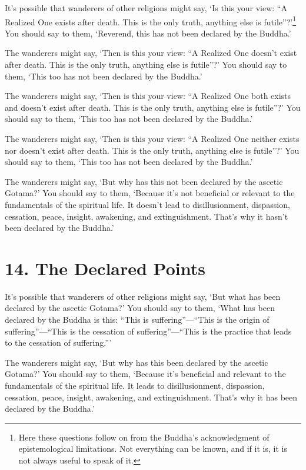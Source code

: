 \documentclass[12pt,openany]{book}%
\begin{document}
It’s possible that wanderers of other religions might say, ‘Is this your view: “A Realized One exists after death. This is the only truth, anything else is futile”?’\footnote{Here these questions follow on from the Buddha’s acknowledgment of epistemological limitations. Not everything can be known, and if it is, it is not always useful to speak of it. } You should say to them, ‘Reverend, this has not been declared by the Buddha.’ 

The wanderers might say, ‘Then is this your view: “A Realized One doesn’t exist after death. This is the only truth, anything else is futile”?’ You should say to them, ‘This too has not been declared by the Buddha.’ 

The wanderers might say, ‘Then is this your view: “A Realized One both exists and doesn’t exist after death. This is the only truth, anything else is futile”?’ You should say to them, ‘This too has not been declared by the Buddha.’ 

The wanderers might say, ‘Then is this your view: “A Realized One neither exists nor doesn’t exist after death. This is the only truth, anything else is futile”?’ You should say to them, ‘This too has not been declared by the Buddha.’ 

The wanderers might say, ‘But why has this not been declared by the ascetic Gotama?’ You should say to them, ‘Because it’s not beneficial or relevant to the fundamentals of the spiritual life. It doesn’t lead to disillusionment, dispassion, cessation, peace, insight, awakening, and extinguishment. That’s why it hasn’t been declared by the Buddha.’ 

\section*{14. The Declared Points }

It’s possible that wanderers of other religions might say, ‘But what has been declared by the ascetic Gotama?’ You should say to them, ‘What has been declared by the Buddha is this: “This is suffering”—“This is the origin of suffering”—“This is the cessation of suffering”—“This is the practice that leads to the cessation of suffering.”’ 

The wanderers might say, ‘But why has this been declared by the ascetic Gotama?’ You should say to them, ‘Because it’s beneficial and relevant to the fundamentals of the spiritual life. It leads to disillusionment, dispassion, cessation, peace, insight, awakening, and extinguishment. That’s why it has been declared by the Buddha.’ 
\end{document}
